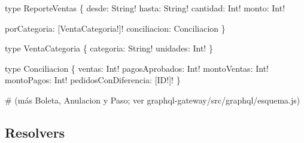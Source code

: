 \begin{codigo}
type ReporteVentas \{ desde:\allowbreak{} String! hasta:\allowbreak{} String! cantidad:\allowbreak{} Int! monto:\allowbreak{} Int!\par
\hspace*{21\ttw}porCategoria:\allowbreak{} [\allowbreak{}VentaCategoria!]! conciliacion:\allowbreak{} Conciliacion \}\par
type VentaCategoria \{ categoria:\allowbreak{} String! unidades:\allowbreak{} Int! \}\par
type Conciliacion \{ ventas:\allowbreak{} Int! pagosAprobados:\allowbreak{} Int! montoVentas:\allowbreak{} Int! montoPagos:\allowbreak{} Int! pedidosConDiferencia:\allowbreak{} [\allowbreak{}ID!]! \}\par
\# (\allowbreak{}más Boleta,\allowbreak{} Anulacion y Paso; ver graphql-\allowbreak{}gateway/\allowbreak{}src/\allowbreak{}graphql/\allowbreak{}esquema.\allowbreak{}js)\par
\end{codigo}

\subsection{Resolvers}

